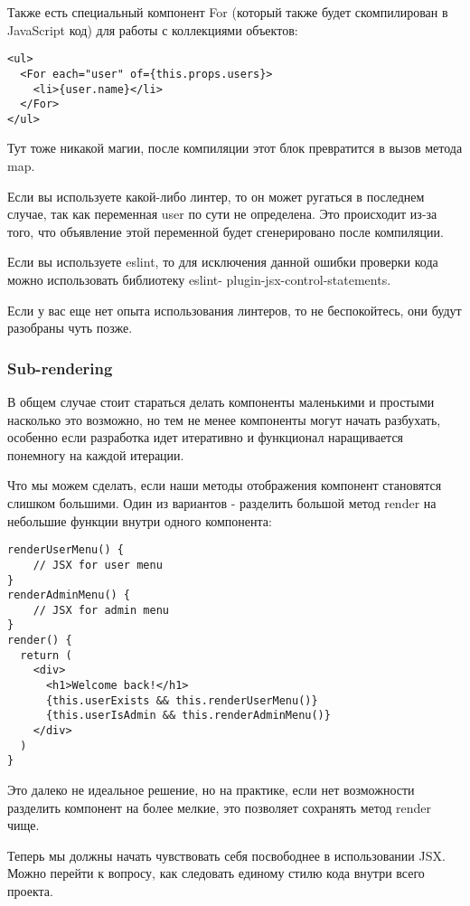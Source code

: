 \documentclass[12pt]{book}
\begin{document}
Также есть специальный компонент For (который также будет скомпилирован в JavaScript код) для работы с коллекциями объектов:

\begin{lstlisting}
<ul>
  <For each="user" of={this.props.users}>
    <li>{user.name}</li>
  </For>
</ul>
\end{lstlisting}

Тут тоже никакой магии, после компиляции этот блок превратится в вызов метода map.

Если вы используете какой-либо линтер, то он может ругаться в последнем случае, так как переменная user по сути не определена. Это происходит из-за того, что объявление этой переменной будет сгенерировано после компиляции.

Если вы используете eslint, то для исключения данной ошибки проверки кода можно использовать библиотеку eslint- plugin-jsx-control-statements.

Если у вас еще нет опыта использования линтеров, то не беспокойтесь, они будут разобраны чуть позже. 

\subsubsection*{Sub-rendering}

В общем случае стоит стараться делать компоненты маленькими и простыми насколько это возможно, но тем не менее компоненты могут начать разбухать, особенно если разработка идет итеративно и функционал наращивается понемногу на каждой итерации.

Что мы можем сделать, если наши методы отображения компонент становятся слишком большими. Один из вариантов - разделить большой метод render на небольшие функции внутри одного компонента:

\begin{lstlisting}
renderUserMenu() {
    // JSX for user menu
}
renderAdminMenu() {
    // JSX for admin menu
}
render() {
  return (
    <div>
      <h1>Welcome back!</h1>
      {this.userExists && this.renderUserMenu()}
      {this.userIsAdmin && this.renderAdminMenu()}
    </div> 
  )
}
\end{lstlisting}

Это далеко не идеальное решение, но на практике, если нет возможности разделить компонент на более мелкие, это позволяет сохранять метод render чище.

Теперь мы должны начать чувствовать себя посвободнее в использовании JSX. Можно перейти к вопросу, как следовать единому стилю кода внутри всего проекта.
\end{document}

